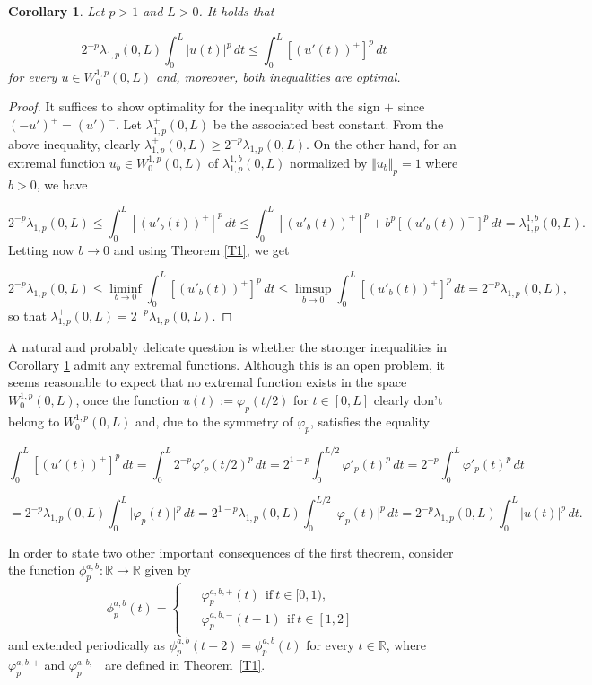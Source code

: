 \documentclass[a4paper,11pt]{article}
\newtheorem{cor}{Corollary}[section]
\begin{document}
{\begin{cor} \label{C1}
Let $p > 1$ and $L > 0$. It holds that

\[
2^{-p} \lambda_{1,p}(0,L) \int_0^L \vert u(t) \vert^p\, dt \leq \int_0^L [(u'(t))^{\pm}]^{p}\, dt
\]
for every $u \in W_0^{1,p}(0,L)$ and, moreover, both inequalities are optimal.
\end{cor}

\begin{proof}
It suffices to show optimality for the inequality with the sign $+$ since $(-u')^{+} = (u')^{-}$. Let $\lambda^+_{1,p}(0,L)$ be the associated best constant. From the above inequality, clearly $\lambda^+_{1,p}(0,L) \geq 2^{-p} \lambda_{1,p}(0,L)$. On the other hand, for an extremal function $u_b \in W_0^{1,p}(0,L)$ of $\lambda_{1,p}^{1,b}(0,L)$ normalized by $\Vert u_b \Vert_p = 1$ where $b > 0$, we have

\[
2^{-p} \lambda_{1,p}(0,L) \leq \int_0^L [(u'_b(t))^{+}]^{p}\, dt \leq \int_0^L [(u'_b(t))^{+}]^{p} + b^{p}[(u'_b(t))^{-}]^{p}\, dt = \lambda_{1,p}^{1,b}(0,L).
\]
Letting now $b \rightarrow 0$ and using Theorem \ref{T1}, we get

\[
2^{-p} \lambda_{1,p}(0,L) \leq \liminf_{b \rightarrow 0} \int_0^L [(u'_b(t))^{+}]^{p}\, dt \leq \limsup_{b \rightarrow 0} \int_0^L [(u'_b(t))^{+}]^{p}\, dt = 2^{-p} \lambda_{1,p}(0,L),
\]
so that $\lambda^+_{1,p}(0,L) = 2^{-p} \lambda_{1,p}(0,L)$.
\end{proof}

A natural and probably delicate question is whether the stronger inequalities in Corollary \ref{C1} admit any extremal functions. Although this is an open problem, it seems reasonable to expect that no extremal function exists in the space $W_0^{1,p}(0,L)$, once the function $u(t):= \varphi_p(t/2)$ for $t \in [0,L]$ clearly don't belong to $W_0^{1,p}(0,L)$ and, due to the symmetry of $\varphi_p$, satisfies the equality

\[
\int_0^L [(u'(t))^{+}]^{p}\, dt = \int_0^L 2^{-p} \varphi'_p(t/2)^{p}\, dt = 2^{1-p} \int_0^{L/2} \varphi'_p(t)^{p}\, dt = 2^{-p} \int_0^{L} \varphi'_p(t)^{p}\, dt
\]

\[
= 2^{-p} \lambda_{1,p}(0,L) \int_0^L \vert \varphi_p(t) \vert^p\, dt = 2^{1-p} \lambda_{1,p}(0,L) \int_0^{L/2} \vert \varphi_p(t) \vert^p\, dt = 2^{-p} \lambda_{1,p}(0,L) \int_0^L \vert u(t) \vert^p\, dt.
\]

In order to state two other important consequences of the first theorem, consider the function $\phi_{p}^{a,b} \colon \mathbb{R} \to \mathbb{R}$ given by
\begin{equation*}
\phi_{p}^{a,b}(t) =
\begin{cases}
\begin{aligned}
     &\varphi_{p}^{a,b,+}(t)\ \ \text{if} \ t \in [0,1), \\
     &\varphi_{p}^{a,b,-}(t-1)\ \ \text{if} \ t \in [1,2]
\end{aligned}
\end{cases}
\end{equation*}
and extended periodically as $\phi_{p}^{a,b}(t+2) = \phi_{p}^{a,b}(t)$ for every $t \in \mathbb{R}$, where $\varphi_{p}^{a,b,+}$ and $\varphi_{p}^{a,b,-}$ are defined in Theorem~\ref{T1}.

}
\end{document}
